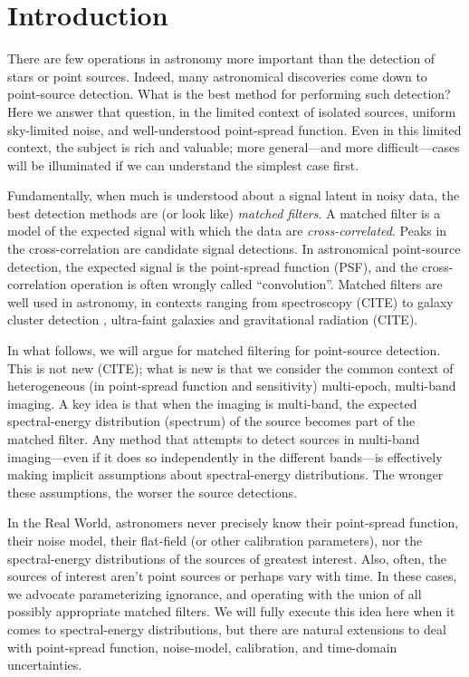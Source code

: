 \documentclass[letterpaper,preprint]{aastex}
\begin{document}

\section{Introduction}

There are few operations in astronomy more important than the
detection of stars or point sources.
Indeed, many astronomical discoveries come down to point-source
detection.
What is the best method for performing such detection?
Here we answer that question, in the limited context of isolated
sources, uniform sky-limited noise, and well-understood point-spread
function.
Even in this limited context, the subject is rich and valuable; more
general---and more difficult---cases will be illuminated if we can
understand the simplest case first.

Fundamentally, when much is understood about a signal latent in noisy
data, the best detection methods are (or look like) \emph{matched
filters}.
A matched filter is a model of the expected signal with which the data
are \emph{cross-correlated}. %
Peaks in the cross-correlation are candidate signal detections.
In astronomical point-source detection, the expected signal is the
point-spread function (PSF), and the cross-correlation operation is often
wrongly called ``convolution''.
Matched filters are well used in astronomy, in contexts ranging from
spectroscopy (CITE) to galaxy cluster detection \citep{postman},
ultra-faint galaxies \citep{willman} and gravitational
radiation (CITE).


In what follows, we will argue for matched filtering for point-source
detection.
This is not new (CITE); what is new is that we consider the common
context of heterogeneous (in point-spread function and sensitivity)
multi-epoch, multi-band imaging.
A key idea is that when the imaging is multi-band, the expected
spectral-energy distribution (spectrum) of the source becomes part of
the matched filter.
Any method that attempts to detect sources in multi-band
imaging---even if it does so independently in the different bands---is
effectively making implicit assumptions about spectral-energy
distributions.
The wronger these assumptions, the worser the source detections.

In the Real World, astronomers never precisely know their point-spread
function, their noise model, their flat-field (or other calibration
parameters), nor the spectral-energy distributions of the sources of
greatest interest.
Also, often, the sources of interest aren't point sources or perhaps
vary with time.
In these cases, we advocate parameterizing ignorance, and operating
with the union of all possibly appropriate matched filters.
We will fully execute this idea here when it comes to spectral-energy
distributions, but there are natural extensions to deal with
point-spread function, noise-model, calibration, and time-domain
uncertainties.
\end{document}
